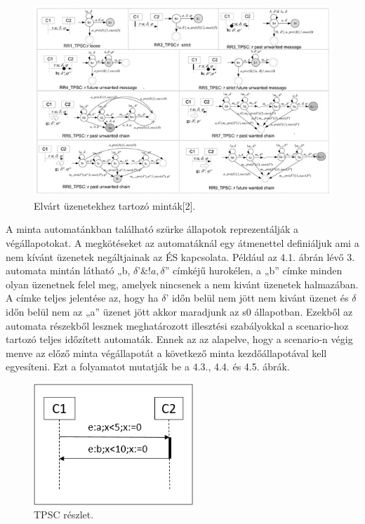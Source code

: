 \begin{figure}[!ht]
    \centering
    \includegraphics[width=150mm, keepaspectratio]{figures/6abra.png}
    \caption{Elvárt üzenetekhez tartozó minták[2].}
\end{figure}

A minta automatánkban található szürke állapotok reprezentálják a végállapotokat.
A megkötéseket az automatáknál egy átmenettel definiáljuk ami a nem kívánt üzenetek negáltjainak az ÉS kapcsolata.
Például az 4.1. ábrán lévő 3. automata mintán látható „b, $\delta ’\&!a, \delta$” címkéjű hurokélen, a „b” címke minden olyan üzenetnek felel meg, amelyek nincsenek a nem kivánt üzenetek halmazában.
A címke teljes jelentése az, hogy ha $\delta$’ időn belül nem jött nem kivánt üzenet és $\delta$ időn belül nem az „a” üzenet jött akkor maradjunk az s0 állapotban.
Ezekből az automata részekből lesznek meghatározott illesztési szabályokkal a scenario-hoz tartozó teljes időzített automaták.
Ennek az az alapelve, hogy a scenario-n végig menve az előző minta végállapotát a következő minta kezdőállapotával kell egyesíteni.
Ezt a folyamatot mutatják be a 4.3., 4.4. és 4.5. ábrák.

\begin{figure}[!ht]
    \centering
    \includegraphics[width=60mm, keepaspectratio]{figures/7abra.png}
    \caption{TPSC részlet.}
\end{figure}

